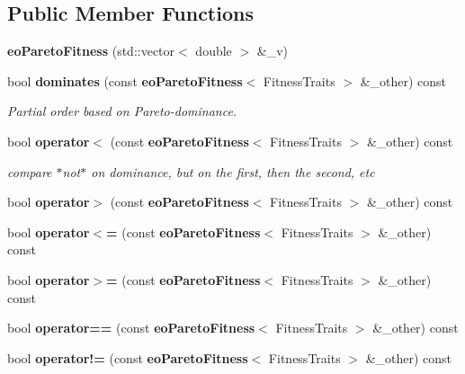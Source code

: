 \subsection*{Public Member Functions}
\begin{CompactItemize}
\item 
{\bf eo\-Pareto\-Fitness} (std::vector$<$ double $>$ \&\_\-v)\label{classeo_pareto_fitness_a1}

\item 
bool {\bf dominates} (const {\bf eo\-Pareto\-Fitness}$<$ Fitness\-Traits $>$ \&\_\-other) const \label{classeo_pareto_fitness_a2}

\begin{CompactList}\small\item\em Partial order based on Pareto-dominance. \item\end{CompactList}\item 
bool {\bf operator$<$} (const {\bf eo\-Pareto\-Fitness}$<$ Fitness\-Traits $>$ \&\_\-other) const \label{classeo_pareto_fitness_a3}

\begin{CompactList}\small\item\em compare $\ast$not$\ast$ on dominance, but on the first, then the second, etc \item\end{CompactList}\item 
bool {\bf operator$>$} (const {\bf eo\-Pareto\-Fitness}$<$ Fitness\-Traits $>$ \&\_\-other) const \label{classeo_pareto_fitness_a4}

\item 
bool {\bf operator$<$=} (const {\bf eo\-Pareto\-Fitness}$<$ Fitness\-Traits $>$ \&\_\-other) const \label{classeo_pareto_fitness_a5}

\item 
bool {\bf operator$>$=} (const {\bf eo\-Pareto\-Fitness}$<$ Fitness\-Traits $>$ \&\_\-other) const \label{classeo_pareto_fitness_a6}

\item 
bool {\bf operator==} (const {\bf eo\-Pareto\-Fitness}$<$ Fitness\-Traits $>$ \&\_\-other) const \label{classeo_pareto_fitness_a7}

\item 
bool {\bf operator!=} (const {\bf eo\-Pareto\-Fitness}$<$ Fitness\-Traits $>$ \&\_\-other) const \label{classeo_pareto_fitness_a8}

\end{CompactItemize}
